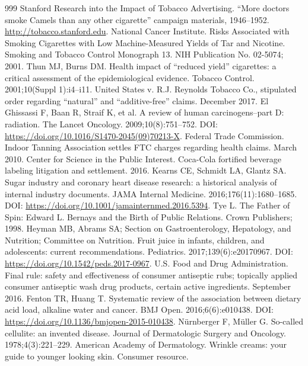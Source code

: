 \documentclass[11pt,oneside]{book}
\begin{document}
\begin{thebibliography}{999}
Stanford Research into the Impact of Tobacco Advertising. ``More doctors smoke Camels than any other cigarette'' campaign materials, 1946--1952. \url{http://tobacco.stanford.edu}.
National Cancer Institute. Risks Associated with Smoking Cigarettes with Low Machine-Measured Yields of Tar and Nicotine. Smoking and Tobacco Control Monograph 13. NIH Publication No. 02-5074; 2001.
Thun MJ, Burns DM. Health impact of ``reduced yield'' cigarettes: a critical assessment of the epidemiological evidence. Tobacco Control. 2001;10(Suppl 1):i4--i11.
United States v. R.J. Reynolds Tobacco Co., stipulated order regarding ``natural'' and ``additive-free'' claims. December 2017.
El Ghissassi F, Baan R, Straif K, et al. A review of human carcinogens--part D: radiation. The Lancet Oncology. 2009;10(8):751--752. DOI: \url{https://doi.org/10.1016/S1470-2045(09)70213-X}.
Federal Trade Commission. Indoor Tanning Association settles FTC charges regarding health claims. March 2010.
Center for Science in the Public Interest. Coca-Cola fortified beverage labeling litigation and settlement. 2016.
Kearns CE, Schmidt LA, Glantz SA. Sugar industry and coronary heart disease research: a historical analysis of internal industry documents. JAMA Internal Medicine. 2016;176(11):1680--1685. DOI: \url{https://doi.org/10.1001/jamainternmed.2016.5394}.
Tye L. The Father of Spin: Edward L. Bernays and the Birth of Public Relations. Crown Publishers; 1998.
Heyman MB, Abrams SA; Section on Gastroenterology, Hepatology, and Nutrition; Committee on Nutrition. Fruit juice in infants, children, and adolescents: current recommendations. Pediatrics. 2017;139(6):e20170967. DOI: \url{https://doi.org/10.1542/peds.2017-0967}.
U.S. Food and Drug Administration. Final rule: safety and effectiveness of consumer antiseptic rubs; topically applied consumer antiseptic wash drug products, certain active ingredients. September 2016.
Fenton TR, Huang T. Systematic review of the association between dietary acid load, alkaline water and cancer. BMJ Open. 2016;6(6):e010438. DOI: \url{https://doi.org/10.1136/bmjopen-2015-010438}.
N\"urnberger F, M\"uller G. So-called cellulite: an invented disease. Journal of Dermatologic Surgery and Oncology. 1978;4(3):221--229.
American Academy of Dermatology. Wrinkle creams: your guide to younger looking skin. Consumer resource.


\end{thebibliography}
\end{document}
